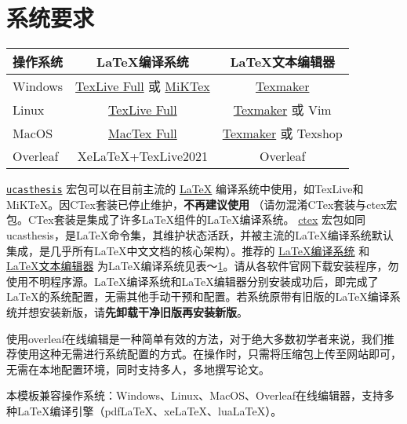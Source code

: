 \section{系统要求}\label{sec:system}
\begin{table}
    \footnotesize%
    \setlength{\tabcolsep}{4pt}%
    \renewcommand{\arraystretch}{1.5}%
    \centering
    \begin{tabular}{lcc}
        \hline
        操作系统 & LaTeX编译系统 & LaTeX文本编辑器\\
        \hline
        Windows & \href{https://www.tug.org/texlive/acquire-netinstall.html}{TexLive Full} 或 \href{https://miktex.org/download}{MiKTex} & \href{http://www.xm1math.net/texmaker/}{Texmaker}\\
        Linux & \href{https://www.tug.org/texlive/acquire-netinstall.html}{TexLive Full} & \href{http://www.xm1math.net/texmaker/}{Texmaker} 或 Vim\\
        MacOS & \href{https://www.tug.org/mactex/}{MacTex Full} & \href{http://www.xm1math.net/texmaker/}{Texmaker} 或 Texshop\\
        Overleaf & XeLaTeX+TexLive2021 & Overleaf \\
        \hline
    \end{tabular}
    \label{tab:compiler}
\end{table}
\href{https://github.com/mohuangrui/ucasthesis}{\texttt{ucasthesis}} 宏包可以在目前主流的 \href{https://en.wikibooks.org/wiki/LaTeX/Introduction}{LaTeX} 编译系统中使用，如TexLive和MiKTeX。因CTex套装已停止维护，\textbf{不再建议使用} （请勿混淆CTex套装与ctex宏包。CTex套装是集成了许多LaTeX组件的LaTeX编译系统。 \href{https://ctan.org/pkg/ctex?lang=en}{ctex} 宏包如同ucasthesis，是LaTeX命令集，其维护状态活跃，并被主流的LaTeX编译系统默认集成，是几乎所有LaTeX中文文档的核心架构）。推荐的 \href{https://en.wikibooks.org/wiki/LaTeX/Installation}{LaTeX编译系统} 和 \href{https://en.wikibooks.org/wiki/LaTeX/Installation}{LaTeX文本编辑器} 为LaTeX编译系统见表～\ref{tab:compiler}。请从各软件官网下载安装程序，勿使用不明程序源。LaTeX编译系统和LaTeX编辑器分别安装成功后，即完成了LaTeX的系统配置，无需其他手动干预和配置。若系统原带有旧版的LaTeX编译系统并想安装新版，请\textbf{先卸载干净旧版再安装新版}。

使用overleaf在线编辑是一种简单有效的方法，对于绝大多数初学者来说，我们推荐使用这种无需进行系统配置的方式。在操作时，只需将压缩包上传至网站即可，无需在本地配置环境，同时支持多人，多地撰写论文。

本模板兼容操作系统：Windows、Linux、MacOS、Overleaf在线编辑器，支持多种LaTeX编译引擎（pdfLaTeX、xeLaTeX、luaLaTeX）。
